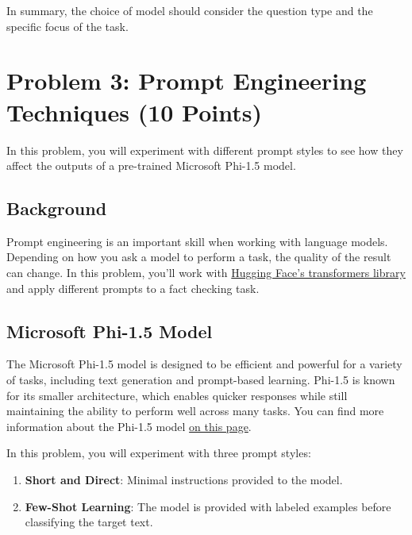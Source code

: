 \documentclass[11pt, oneside]{article}   	%
\begin{document}
\noindent In summary, the choice of model should consider the question type and the specific focus of the task.


\newpage

\section*{Problem 3: Prompt Engineering Techniques (10 Points)}

In this problem, you will experiment with different prompt styles to see how they affect the outputs of a pre-trained Microsoft Phi-1.5 model.

\subsection*{Background}
Prompt engineering is an important skill when working with language models. Depending on how you ask a model to perform a task, the quality of the result can change. In this problem, you'll work with \href{https://huggingface.co/docs/transformers/main_classes/pipelines}{Hugging Face’s transformers library} and apply different prompts to a fact checking task.

\subsection*{Microsoft Phi-1.5 Model}
The Microsoft Phi-1.5 model is designed to be efficient and powerful for a variety of tasks, including text generation and prompt-based learning. Phi-1.5 is known for its smaller architecture, which enables quicker responses while still maintaining the ability to perform well across many tasks. You can find more information about the Phi-1.5 model \href{https://huggingface.co/microsoft/phi-1_5}{on this page}. 

In this problem, you will experiment with three prompt styles:
\begin{enumerate}
    \item \textbf{Short and Direct}: Minimal instructions provided to the model.
    \item \textbf{Few-Shot Learning}: The model is provided with labeled examples before classifying the target text.
\end{enumerate}
\end{document}
